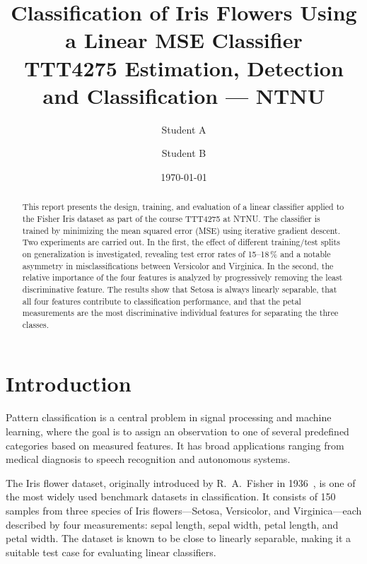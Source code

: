 \documentclass[11pt,a4paper]{article}
\title{Classification of Iris Flowers Using a Linear MSE Classifier \\[0.5em]
\large TTT4275 Estimation, Detection and Classification --- NTNU}
\author{Student A \and Student B}
\date{\today}
\begin{document}
\maketitle

\begin{abstract}
This report presents the design, training, and evaluation of a linear classifier applied to the Fisher Iris dataset as part of the course TTT4275 at NTNU. The classifier is trained by minimizing the mean squared error (MSE) using iterative gradient descent. Two experiments are carried out. In the first, the effect of different training/test splits on generalization is investigated, revealing test error rates of 15--18\,\% and a notable asymmetry in misclassifications between Versicolor and Virginica. In the second, the relative importance of the four features is analyzed by progressively removing the least discriminative feature. The results show that Setosa is always linearly separable, that all four features contribute to classification performance, and that the petal measurements are the most discriminative individual features for separating the three classes.
\end{abstract}

\tableofcontents
\newpage

\section{Introduction}

Pattern classification is a central problem in signal processing and machine learning, where the goal is to assign an observation to one of several predefined categories based on measured features. It has broad applications ranging from medical diagnosis to speech recognition and autonomous systems.

The Iris flower dataset, originally introduced by R.~A.~Fisher in 1936~\cite{fisher1936}, is one of the most widely used benchmark datasets in classification. It consists of 150 samples from three species of Iris flowers---Setosa, Versicolor, and Virginica---each described by four measurements: sepal length, sepal width, petal length, and petal width. The dataset is known to be close to linearly separable, making it a suitable test case for evaluating linear classifiers.
\end{document}
